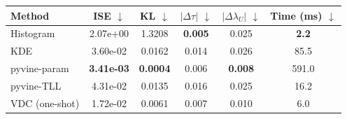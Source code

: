 \begin{tabular}{lccccc}
\toprule
Method & ISE $\downarrow$ & KL $\downarrow$ & $|\Delta\tau|$ $\downarrow$ & $|\Delta\lambda_U|$ $\downarrow$ & Time (ms) $\downarrow$ \\
\midrule
Histogram & 2.07e+00 & 1.3208 & \textbf{0.005} & 0.025 & \textbf{2.2} \\
KDE & 3.60e-02 & 0.0162 & 0.014 & 0.026 & 85.5 \\
pyvine-param & \textbf{3.41e-03} & \textbf{0.0004} & 0.006 & \textbf{0.008} & 591.0 \\
pyvine-TLL & 4.31e-02 & 0.0135 & 0.016 & 0.025 & 16.2 \\
VDC (one-shot) & 1.72e-02 & 0.0061 & 0.007 & 0.010 & 6.0 \\
\bottomrule
\end{tabular}
